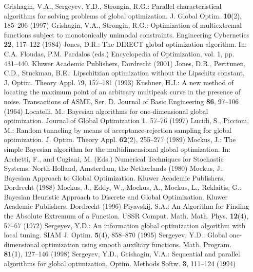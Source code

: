 \begin{thebibliography}{99.}
 Grishagin, V.A., Sergeyev, Y.D., Strongin, R.G.: Parallel characteristical algorithms for solving problems of global optimization. J. Global Optim. \textbf{10}(2), 185–206 (1997)
 Grishagin, V.A., Strongin, R.G.: Optimization of multiextremal functions subject to monotonically unimodal constraints. Engineering Cybernetics \textbf{22},  117--122 (1984)
Jones, D.R.: The DIRECT global optimization algorithm. In: C.A. Floudas, P.M. Pardalos
(eds.) Encyclopedia of Optimization, vol. 1, pp. 431–440. Kluwer Academic Publishers, Dordrecht (2001)
Jones, D.R., Perttunen, C.D.,   Stuckman, B.E.: Lipschitzian optimization
without the Lipschitz constant, J. Optim. Theory Appl. 79,  157--181 (1993)
	Kushner, H.J.: A new method of locating the maximum point of an arbitrary multipeak curve in the presence of noise. Transactions of ASME, Ser. D. Journal of Basic Engineering \textbf{86}, 97--106 (1964)
 Locatelli, M.: Bayesian algorithms for one-dimensional global optimization. Journal of Global Optimization \textbf{1}, 57--76 (1997)
 Lucidi, S., Piccioni, M.:  Random tunneling by means of acceptance-rejection sampling for global optimization. J. Optim. Theory Appl. \textbf{62}(2), 255--277 (1989)
 Mockus, J.: The simple Bayesian algorithm for the multidimensional global optimization. In: Archetti, F., and Cugiani, M. (Eds.) Numerical Techniques for Stochastic Systems. North-Holland, Amsterdam,
the Netherlands (1980)
	Mockus, J.: Bayesian Approach to Global Optimization. Kluwer Academic Publishers, Dordrecht (1988)
 Mockus, J., Eddy, W., Mockus, A., Mockus, L., Reklaitis, G.: Bayesian Heuristic Approach
to Discrete and Global Optimization. Kluwer Academic Publishers, Dordrecht (1996)
	Piyavskij, S.A.: An Algorithm for Finding the Absolute Extremum of a Function. USSR Comput. Math. Math. Phys. \textbf{12}(4), 57--67 (1972)
 Sergeyev, Y.D.: An information global optimization algorithm with local tuning. SIAM J. Optim. \textbf{5}(4), 858–870 (1995)
 Sergeyev, Y.D.: Global one-dimensional optimization using smooth auxiliary functions. Math. Program. \textbf{81}(1), 127–146 (1998)
 Sergeyev, Y.D., Grishagin, V.A.: Sequential and parallel algorithms for global optimization, Optim. Methods Softw. \textbf{3},  111--124 (1994)

\end{thebibliography}
